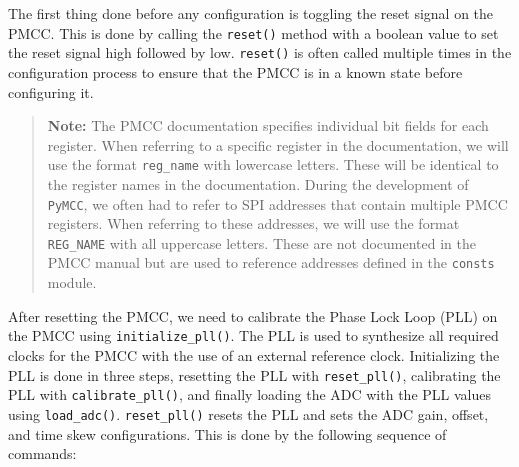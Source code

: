The first thing done before any configuration is toggling the reset signal on the PMCC.
This is done by calling the \texttt{reset()} method with a boolean value to set the reset signal high followed by low.
\texttt{reset()} is often called multiple times in the configuration process to ensure that the PMCC is in a known state before configuring it.

\begin{quote}
    \textbf{Note:} The PMCC documentation specifies individual bit fields for each register. 
    When referring to a specific register in the documentation, we will use the format \texttt{reg\_name} with lowercase letters. 
    These will be identical to the register names in the documentation. 
    During the development of \texttt{PyMCC}, we often had to refer to SPI addresses that contain multiple PMCC registers. 
    When referring to these addresses, we will use the format \texttt{REG\_NAME} with all uppercase letters.
    These are not documented in the PMCC manual but are used to reference addresses defined in the \texttt{consts} module.
\end{quote}

After resetting the PMCC, we need to calibrate the Phase Lock Loop (PLL) on the PMCC using \texttt{initialize\_pll()}.
The PLL is used to synthesize all required clocks for the PMCC with the use of an external reference clock. 
Initializing the PLL is done in three steps, resetting the PLL with \texttt{reset\_pll()}, calibrating the PLL with \texttt{calibrate\_pll()}, and finally loading the ADC with the PLL values using \texttt{load\_adc()}.
\texttt{reset\_pll()} resets the PLL and sets the ADC gain, offset, and time skew configurations. 
This is done by the following sequence of commands:

